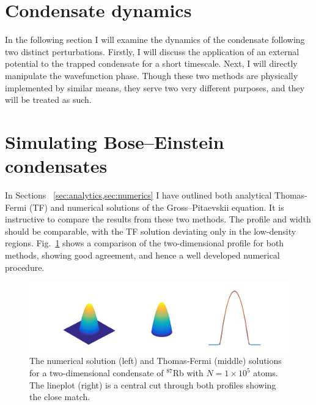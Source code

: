 \section{Condensate dynamics}
In the following section I will examine the dynamics of the condensate following two distinct perturbations. Firstly, I will discuss the application of an external potential to the trapped condensate for a short timescale. Next, I will directly manipulate the wavefunction phase. Though these two methods are physically implemented by similar means, they serve two very different purposes, and they will be treated as such.

\section{Simulating Bose--Einstein condensates}
In Sections ~\ref{sec:analytics,sec:numerics} I have outlined both analytical Thomas-Fermi (TF) and numerical solutions of the Gross--Pitaevskii equation. It is instructive to compare the results from these two methods. The profile and width should be comparable, with the TF solution deviating only in the low-density regions. Fig.~\ref{fig:gpe_tf_3} shows a comparison of the two-dimensional profile for both methods, showing good agreement, and hence a well developed numerical procedure.
\begin{figure}\centering
    \includegraphics[width=\textwidth,trim=0ex 0ex 0ex 0ex]{Images/ch4_vtx/gpe_tf_3.pdf}
    \caption{The numerical solution (left) and Thomas-Fermi (middle) solutions for a two-dimensional condensate of $^{87}$Rb with $N=1\times 10^5$ atoms. The lineplot (right) is a central cut through both profiles showing the close match.}\label{fig:gpe_tf_3}
\end{figure}

